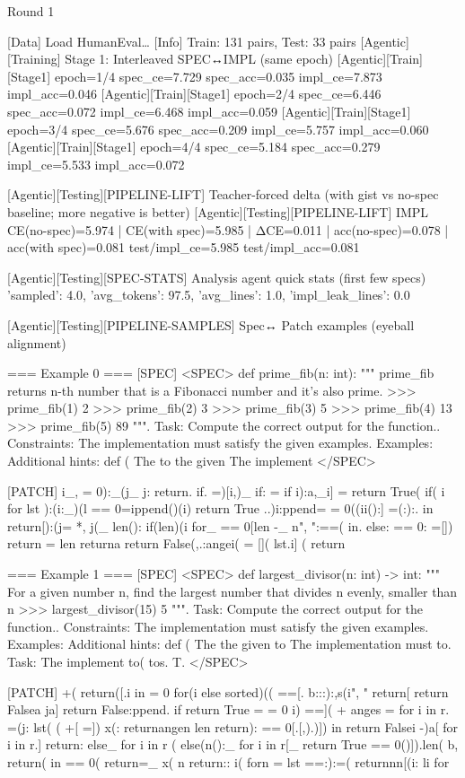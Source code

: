 Round 1

[Data] Load HumanEval…
[Info] Train: 131 pairs, Test: 33 pairs
[Agentic][Training] Stage 1: Interleaved SPEC↔IMPL (same epoch)
[Agentic][Train][Stage1] epoch=1/4 spec_ce=7.729 spec_acc=0.035 impl_ce=7.873 impl_acc=0.046
[Agentic][Train][Stage1] epoch=2/4 spec_ce=6.446 spec_acc=0.072 impl_ce=6.468 impl_acc=0.059
[Agentic][Train][Stage1] epoch=3/4 spec_ce=5.676 spec_acc=0.209 impl_ce=5.757 impl_acc=0.060
[Agentic][Train][Stage1] epoch=4/4 spec_ce=5.184 spec_acc=0.279 impl_ce=5.533 impl_acc=0.072

[Agentic][Testing][PIPELINE-LIFT] Teacher-forced delta (with gist vs no-spec baseline; more negative is better)
[Agentic][Testing][PIPELINE-LIFT] IMPL CE(no-spec)=5.974 | CE(with spec)=5.985 | ΔCE=0.011 | acc(no-spec)=0.078 | acc(with spec)=0.081
test/impl_ce=5.985 test/impl_acc=0.081

[Agentic][Testing][SPEC-STATS] Analysis agent quick stats (first few specs)
{'sampled': 4.0, 'avg_tokens': 97.5, 'avg_lines': 1.0, 'impl_leak_lines': 0.0}

[Agentic][Testing][PIPELINE-SAMPLES] Spec↔ Patch examples (eyeball alignment)

=== Example 0 ===
[SPEC]
<SPEC> def prime_fib(n: int): """ prime_fib returns n-th number that is a Fibonacci number and it's also prime. >>> prime_fib(1) 2 >>> prime_fib(2) 3 >>> prime_fib(3) 5 >>> prime_fib(4) 13 >>> prime_fib(5) 89 """. Task: Compute the correct output for the function.. Constraints: The implementation must satisfy the given examples. Examples: Additional hints: def ( The to the given The implement </SPEC>

[PATCH]
i_, = 0):_(j_ j: return. if. =)[i,)_ if:  = if i):a,_i] = return True(  if( i for lst ):(i:_)(l == 0=ippend()(i) return True ..)i:ppend= = 0((ii():] =(:):. in return[):(j= *, j(_ len(): if(len)(i for_ == 0[len -_ n", ":==( in. else: == 0: =[]) return = len returna return False(,.:angei( = []( lst.i] ( return

=== Example 1 ===
[SPEC]
<SPEC> def largest_divisor(n: int) -> int: """ For a given number n, find the largest number that divides n evenly, smaller than n >>> largest_divisor(15) 5 """. Task: Compute the correct output for the function.. Constraints: The implementation must satisfy the given examples. Examples: Additional hints: def ( The the given to The implementation must to. Task: The implement to( tos. T. </SPEC>

[PATCH]
+( return([.i in = 0 for(i else sorted)(( ==[. b:::):,s(i", " return[ return Falsea ja] return False:ppend. if return True = = 0 i) ==]( + anges = for i in r. =(j: lst( ( +[ =]) x(: returnangen len return): == 0[.[,).)]) in return Falsei -)a[ for i in r.] return: else_ for i in r ( else(n():_ for i in r[_ return True  == 0()]).len( b, return( in == 0( return=_ x( n return:: i( forn = lst ==:):=( returnnn[(i: li for

